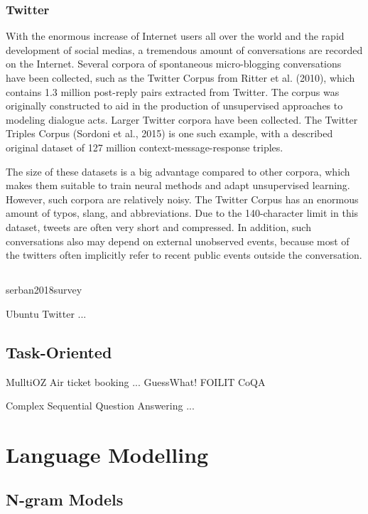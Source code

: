 \documentclass[bsc,frontabs,twoside,singlespacing,parskip,deptreport]{infthesis}     %
\begin{document}
\subsubsection{Twitter}

With the enormous increase of Internet users all over the world and the rapid development of social medias, a tremendous amount of conversations are recorded on the Internet. Several corpora of spontaneous micro-blogging conversations have been collected, such as the 
Twitter Corpus from Ritter et al. (2010), which contains 1.3 million post-reply pairs extracted from Twitter. The corpus was originally constructed to aid in the production of unsupervised approaches to modeling dialogue acts. Larger Twitter corpora have been collected. The Twitter Triples Corpus (Sordoni et al., 2015) is one such example, with a described original dataset of 127 million context-message-response triples.

The size of these datasets is a big advantage compared to other corpora, which makes them suitable to train neural methods and adapt unsupervised learning. However, such corpora are relatively noisy. The Twitter Corpus has an enormous amount of typos, slang, and abbreviations. Due to the 140-character limit in this dataset, tweets are often very short and compressed. In addition, such conversations also may depend on external unobserved events, because most of the twitters often implicitly refer to recent public events outside the conversation.


\subsection{}{}

serban2018survey

Ubuntu
Twitter
...


\subsection{Task-Oriented}
MulltiOZ
Air ticket booking
...
GuessWhat!
FOILIT
CoQA


Complex Sequential Question Answering\cite{saha2018complex}
...



\section{Language Modelling}
\subsection{N-gram Models}
\end{document}
